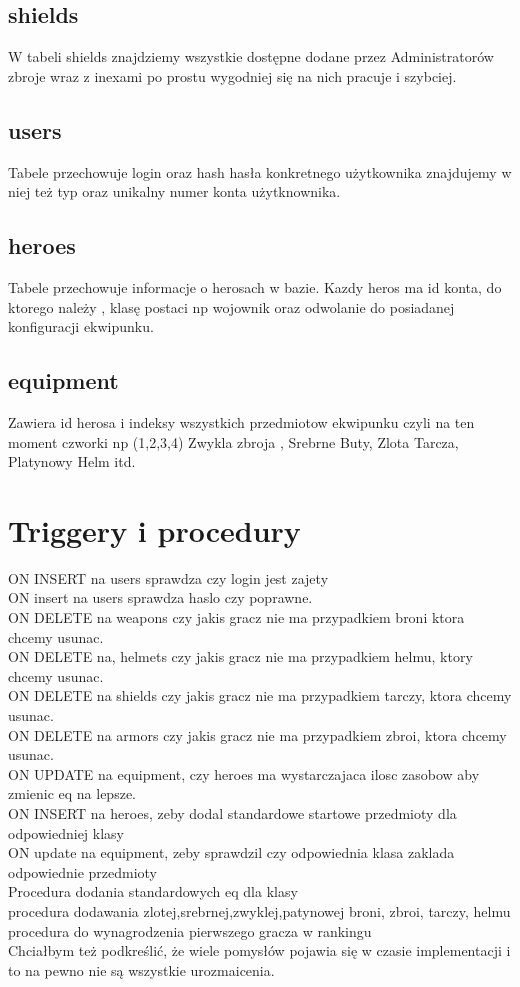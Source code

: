 \documentclass[11pt]{article}
\begin{document}
\begin{flushleft}
\subsection{shields}
W tabeli shields znajdziemy wszystkie dostępne dodane przez Administratorów zbroje wraz z inexami po prostu wygodniej się na nich pracuje i szybciej. 
\subsection{users}
Tabele przechowuje login oraz hash hasła konkretnego użytkownika znajdujemy w niej też typ oraz unikalny numer konta użytknownika.
\subsection{heroes}
Tabele przechowuje informacje o herosach w bazie. Kazdy heros ma id konta, do ktorego należy , klasę postaci np wojownik oraz odwolanie do posiadanej konfiguracji ekwipunku.
\subsection{equipment}
Zawiera id herosa i indeksy wszystkich przedmiotow ekwipunku czyli na ten moment czworki np (1,2,3,4) Zwykla zbroja , Srebrne Buty, Zlota Tarcza, Platynowy Helm itd. 
\section{Triggery i procedury}
 ON INSERT na users sprawdza czy login jest zajety
\\ ON insert na users sprawdza haslo czy poprawne.
\\ON DELETE na weapons czy jakis gracz nie ma przypadkiem broni ktora chcemy usunac.
\\ON DELETE na, helmets czy jakis gracz nie ma przypadkiem helmu, ktory chcemy usunac.
\\ON DELETE na shields czy jakis gracz nie ma przypadkiem tarczy, ktora chcemy usunac.
\\ON DELETE na armors czy jakis gracz nie ma przypadkiem zbroi, ktora chcemy usunac.
\\ON UPDATE na equipment, czy heroes ma wystarczajaca ilosc zasobow aby zmienic eq na lepsze.
\\ON INSERT na heroes, zeby dodal standardowe startowe przedmioty dla odpowiedniej klasy
\\ON update na equipment, zeby sprawdzil czy odpowiednia klasa zaklada odpowiednie przedmioty
\\Procedura dodania standardowych eq dla klasy
\\ procedura dodawania zlotej,srebrnej,zwyklej,patynowej broni, zbroi, tarczy, helmu
\\procedura do wynagrodzenia pierwszego gracza w rankingu
\\ Chciałbym też podkreślić, że wiele pomysłów pojawia się w czasie implementacji i to na pewno nie są wszystkie urozmaicenia.
\newpage

\end{flushleft}
\end{document}
